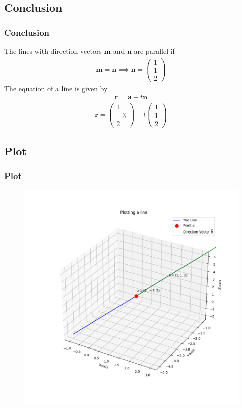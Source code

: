 \documentclass{beamer}
\theoremstyle{remark}
\newcommand{\myvec}[1]{\ensuremath{\begin{pmatrix}#1\end{pmatrix}}}
\let\vec\mathbf
\numberwithin{equation}{section}
\begin{document}
\subsection{Conclusion}
\begin{frame}
\frametitle{Conclusion}
 The lines with direction vectors $\vec{m}$ and $\vec{n}$ are parallel if
\begin{align}
\vec{m}=\vec{n}  \implies  \vec{n}=\myvec{1\\1\\2}
\end{align}
The equation of a line is given by
\begin{align}
\vec{r}=\vec{a}+t\vec{n}
\end{align}
\begin{align}
\vec{r}=\myvec{1\\-3\\2}+t\myvec{1\\1\\2}
\end{align}
\end{frame}

\subsection{Plot}
\begin{frame}[fragile]
\frametitle{Plot}

\begin{figure}[h!]
   \centering
   \includegraphics[width=0.7\columnwidth]{figs/fig1.png}
	\caption{}
   \label{}
\end{figure}
\end{frame}
\end{document}
